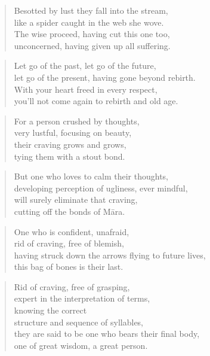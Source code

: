 \documentclass[12pt,openany]{book}%
\begin{document}
\begin{verse}%
Besotted by lust they fall into the stream, \\
like a spider caught in the web she wove. \\
The wise proceed, having cut this one too, \\
unconcerned, having given up all suffering. 

%
\end{verse}

\begin{verse}%
Let go of the past, let go of the future, \\
let go of the present, having gone beyond rebirth. \\
With your heart freed in every respect, \\
you’ll not come again to rebirth and old age. 

%
\end{verse}

\begin{verse}%
For a person crushed by thoughts, \\
very lustful, focusing on beauty, \\
their craving grows and grows, \\
tying them with a stout bond. 

%
\end{verse}

\begin{verse}%
But one who loves to calm their thoughts, \\
developing perception of ugliness, ever mindful, \\
will surely eliminate that craving, \\
cutting off the bonds of \textsanskrit{Māra}. 

%
\end{verse}

\begin{verse}%
One who is confident, unafraid, \\
rid of craving, free of blemish, \\
having struck down the arrows flying to future lives, \\
this bag of bones is their last. 

%
\end{verse}

\begin{verse}%
Rid of craving, free of grasping, \\
expert in the interpretation of terms, \\
knowing the correct \\
structure and sequence of syllables, \\
they are said to be one who bears their final body, \\
one of great wisdom, a great person. 

%
\end{verse}
\end{document}
